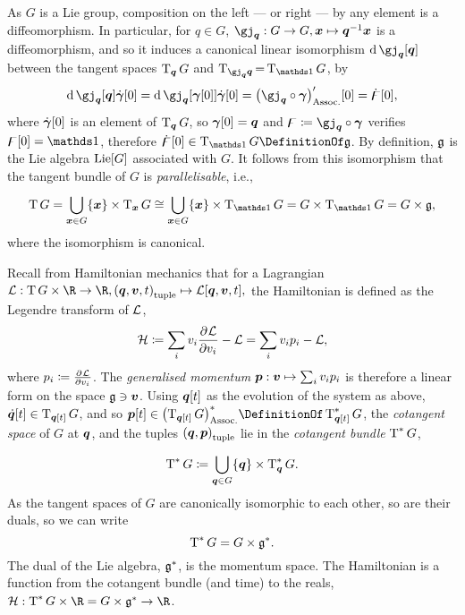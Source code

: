 \documentclass[10pt]{article}
\newenvironment{supplemental}{
\begin{mdframed}%
[hidealllines=true,                 %
  backgroundcolor=red!15!yellow!10  %
]}{\end{mdframed}}
\begin{document}
\begin{supplemental}
As $G$ is a Lie group, composition on the left --- or right --- by any element is a diffeomorphism. In particular, for $q\in G$,
$\FunctionSpec {\gj_\vq} G G, \FunctionBody \vx {\vq^{-1} \vx}$ is a diffeomorphism, and so it induces a canonical linear isomorphism $\diffd \gj_\vq \of\vq$ between the tangent spaces $\TangentSpace{\vq}G$ and $\TangentSpace{\gj_\vq\vq}=\TangentSpace{\Identity}G$, by
\begin{equation*}
\diffd \gj_\vq \of\vq\TimeDerivative\vgg\of 0 = \diffd \gj_\vq \of{\vgg\of 0}\TimeDerivative\vgg\of 0 = \pa{\gj_\vq\Compose\vgg}\der\of 0 = \TimeDerivative\vgdig\of 0,
\end{equation*}
where $\TimeDerivative\vgg\of{0}$ is an element of $\TangentSpace{\vq}G$, so $\vgg\of 0 = \vq$ and $\vgdig \DefineAs \gj_\vq\Compose\vgg$ verifies $\vgdig\of 0 = \Identity$, therefore $\TimeDerivative\vgdig\of0\in\TangentSpace\Identity G \DefinitionOf \VelocitySpace$. By definition, $\mathfrak{g}$ is the Lie algebra $\LieAlgebra\of G$ associated with $G$.
It follows from this isomorphism that the tangent bundle of $G$ is \emph{parallelisable}, i.e.,
\begin{equation*}
\TangentBundle G = \UnionOver{\vx \in G} \set{\vx} \Cartesian \TangentSpace{\vx}G \Isomorphic \UnionOver{\vx \in G} \set{\vx} \Cartesian \TangentSpace\Identity G = G \Cartesian \TangentSpace\Identity G = G \Cartesian \VelocitySpace,
\end{equation*}
where the isomorphism is canonical.

Recall from Hamiltonian mechanics that for a Lagrangian
$
\FunctionSpec \Lagrangian {\TangentBundle G \Cartesian \R}{\R}, \FunctionBody {\tuple{\vq,\vv,t}} {\Lagrangian\of{\vq,\vv,t}},
$
the Hamiltonian is defined as the Legendre transform of $\mathcal{L}$,
\begin{equation*}
\Hamiltonian \DefineAs \sum i v_i \pderiv{v_i}\Lagrangian - \Lagrangian = \sum i v_i p_i - \Lagrangian,
\end{equation*}
where $p_i \coloneqq \frac{\partial^{} \mathcal{L}}{{\partial {v_i}}^{}}$. The \emph{generalised momentum} $\FunctionNamedBody\vp \vv {\sum i v_i p_i}$ is therefore a linear form on the space $\VelocitySpace\owns\vv$. Using $\vq\of t$ as the evolution of the system as above, $\TimeDerivative\vq\of t \in \TangentSpace{\vq\of t}G$, and so $\vp\of t\in \Dual{\pa{\TangentSpace{\vq\of t}G}} \DefinitionOf \CotangentSpace{\vq\of t}G$, the \emph{cotangent space} of $G$ at $\vq$, and the tuples $\tuple{\vq,\vp}$ lie in the \emph{cotangent bundle} $\operatorname{T}^*{G}$,
\begin{equation*}
\CotangentBundle G \DefineAs \UnionOver{\vq\in G}\set\vq \Cartesian \CotangentSpace\vq G.
\end{equation*}
As the tangent spaces of $G$ are canonically isomorphic to each other, so are their duals, so we can write
\begin{equation*}
\operatorname{T}^*{G} = G \times \mathfrak{g}^*.
\end{equation*}
The dual of the Lie algebra, $\mathfrak{g}^*$, is the momentum space. The Hamiltonian is a function from the cotangent bundle (and time) to the reals, $\FunctionSpec\Hamiltonian {\CotangentBundle G \Cartesian \R = G \Cartesian \MomentumSpace} \R$.


\end{supplemental}
\end{document}
